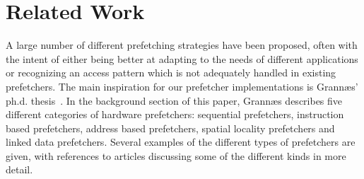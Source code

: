 
\section{Related Work}
\label{sec:relatedWork}

A large number of different prefetching strategies have been proposed,
often with the intent of either being better at adapting to the needs
of different applications or recognizing an access pattern which is
not adequately handled in existing prefetchers. The main inspiration
for our prefetcher implementations is Grannæs'
ph.d. thesis~\cite{Grannas}. In the background section of this paper,
Grannæs describes five different categories of hardware prefetchers:
sequential prefetchers, instruction based prefetchers, address based
prefetchers, spatial locality prefetchers and linked data
prefetchers. Several examples of the different types of prefetchers
are given, with references to articles discussing some of the
different kinds in more detail.
